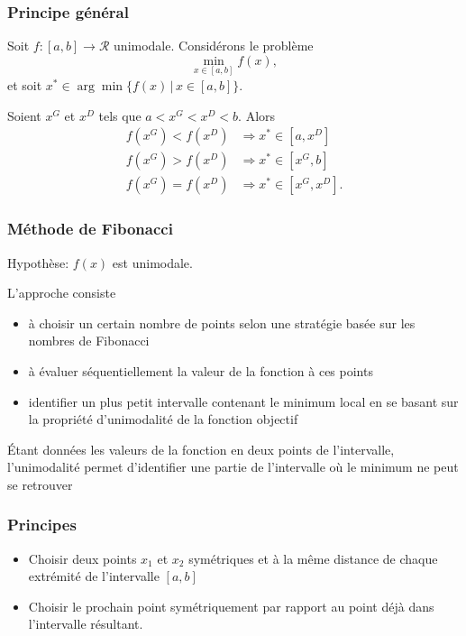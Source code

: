 \documentclass[usepdftitle=false]{beamer}
\def\cR{\mathcal{R}}
\begin{document}
\begin{frame}
\frametitle{Principe général}

Soit $f: [a, b] \rightarrow \cR$ unimodale. Considérons le problème
$$
\min_{x \in [a,b]} f(x),
$$
et soit $x^* \in \arg\min \{ f(x) \,|\, x \in [a,b] \}$.

\mbox{}

Soient $x^G$ et $x^D$ tels que $a < x^G < x^D < b$. Alors
\begin{align*}
f(x^G) < f(x^D) & \Rightarrow x^* \in [a, x^D] \\
f(x^G) > f(x^D) & \Rightarrow x^* \in [x^G, b] \\
f(x^G) = f(x^D) & \Rightarrow x^* \in [x^G, x^D].
\end{align*}

\end{frame}

\begin{frame}
\frametitle{Méthode de Fibonacci}

{\color{blue}Hypothèse}: $f(x)$ est unimodale.

\mbox{}

L’approche consiste
\begin{itemize}
\item 
à choisir un certain nombre de points selon une stratégie basée sur les
nombres de Fibonacci
\item 
à évaluer séquentiellement la valeur de la fonction à ces points
\item 
identifier un plus petit intervalle contenant le
minimum local en se basant sur la propriété d’unimodalité de la
fonction objectif
\end{itemize}

\mbox{}

Étant données les valeurs de la fonction en deux points de l'intervalle,
l'unimodalité permet d'identifier une partie de l'intervalle où le minimum
ne peut se retrouver

\end{frame}

\begin{frame}
\frametitle{Principes}

\begin{itemize}
	\item 
Choisir deux points $x_1$ et $x_2$ symétriques et à la même distance
de chaque extrémité de l’intervalle $[a, b]$
\item
Choisir le prochain point symétriquement par
rapport au point déjà dans l’intervalle résultant.
\end{itemize}

\end{frame}
\end{document}
